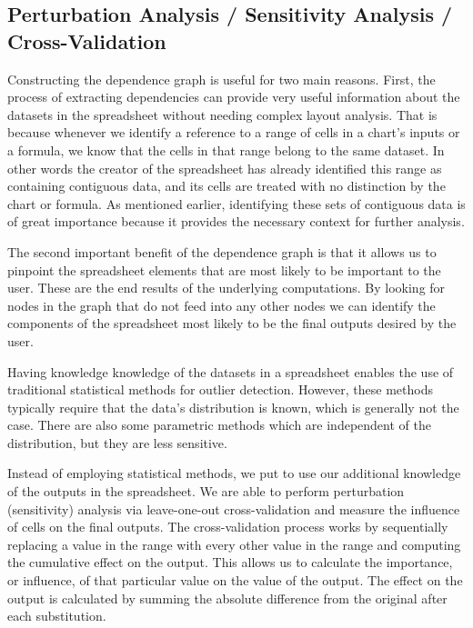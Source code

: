 \subsection{Perturbation Analysis / Sensitivity Analysis / Cross-Validation}

Constructing the dependence graph is useful for two main
reasons. First, the process of extracting dependencies can provide
very useful information about the datasets in the spreadsheet without
needing complex layout analysis.  That is because whenever we identify
a reference to a range of cells in a chart's inputs or a formula,
we know that the cells in that range belong to the same dataset.  In
other words the creator of the spreadsheet has already identified this
range as containing contiguous data, and its cells are treated with no
distinction by the chart or formula.  As mentioned earlier,
identifying these sets of contiguous data is of great importance
because it provides the necessary context for further analysis.

The second important benefit of the dependence graph is that it allows
us to pinpoint the spreadsheet elements that are most likely to be
important to the user.  These are the end results of the underlying
computations.  By looking for nodes in the graph that do not feed into
any other nodes we can identify the components of the spreadsheet most
likely to be the final outputs desired by the user.

Having knowledge knowledge of the datasets in a spreadsheet enables
the use of traditional statistical methods for outlier detection.
However, these methods typically require that the data's
distribution is known, which is generally not the case.  There are
also some parametric methods which are independent of the
distribution, but they are less sensitive.

Instead of employing statistical methods, we put to use our additional
knowledge of the outputs in the spreadsheet.  We are able to perform
perturbation (sensitivity) analysis via leave-one-out cross-validation
and measure the influence of cells on the final outputs.  The
cross-validation process works by sequentially replacing a value in
the range with every other value in the range and computing the
cumulative effect on the output.  This allows us to calculate the
importance, or influence, of that particular value on the value of the
output.  The effect on the output is calculated by summing the
absolute difference from the original after each substitution.

